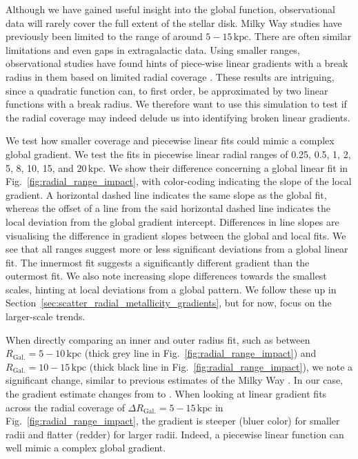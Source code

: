 \documentclass[twocolumn,apj,numberedappendix,appendixfloats]{openjournal}
\begin{document}
\begin{CJK*}{UTF8}{gbsn}
Although we have gained useful insight into the global function, observational data will rarely cover the full extent of the stellar disk. Milky Way studies have previously been limited to the range of around $5-15\,\mathrm{kpc}$. There are often similar limitations and even gaps in extragalactic data. Using smaller ranges, observational studies have found hints of piece-wise linear gradients with a break radius in them based on limited radial coverage \citep[e.g.][]{Andrievsky2002, Yong2012, Boeche2013, Hayden2014, Anders2017, Donor2020, Chen2023}. These results are intriguing, since a quadratic function can, to first order, be approximated by two linear functions with a break radius. We therefore want to use this simulation to test if the radial coverage may indeed delude us into identifying broken linear gradients.

We test how smaller coverage and piecewise linear fits could mimic a complex global gradient. We test the fits in piecewise linear radial ranges of 0.25, 0.5, 1, 2, 5, 8, 10, 15, and $20\,\mathrm{kpc}$. We show their difference concerning a global linear fit in Fig.~\ref{fig:radial_range_impact}, with color-coding indicating the slope of the local gradient. A horizontal dashed line indicates the same slope as the global fit, whereas the offset of a line from the said horizontal dashed line indicates the local deviation from the global gradient intercept. Differences in line slopes are visualising the difference in gradient slopes between the global and local fits. We see that all ranges suggest more or less significant deviations from a global linear fit. The innermost fit suggests a significantly different gradient than the outermost fit. We also note increasing slope differences towards the smallest scales, hinting at local deviations from a global pattern. We follow these up in Section~\ref{sec:scatter_radial_metallicity_gradients}, but for now, focus on the larger-scale trends.

When directly comparing an inner and outer radius fit, such as between $R_\mathrm{Gal.} = 5-10\,\mathrm{kpc}$ (thick grey line in Fig.~\ref{fig:radial_range_impact}) and $R_\mathrm{Gal.} = 10-15\,\mathrm{kpc}$ (thick black line in Fig.~\ref{fig:radial_range_impact}), we note a significant change, similar to previous estimates of the Milky Way \citep[e.g.][]{Yong2012, Lemasle2008}. In our case, the gradient estimate changes from  to . When looking at linear gradient fits across the radial coverage of $\Delta R_\mathrm{Gal.} = 5-15\,\mathrm{kpc}$ in Fig.~\ref{fig:radial_range_impact}, the gradient is steeper (bluer color) for smaller radii and flatter (redder) for larger radii. Indeed, a piecewise linear function can well mimic a complex global gradient.


\end{CJK*}
\end{document}
